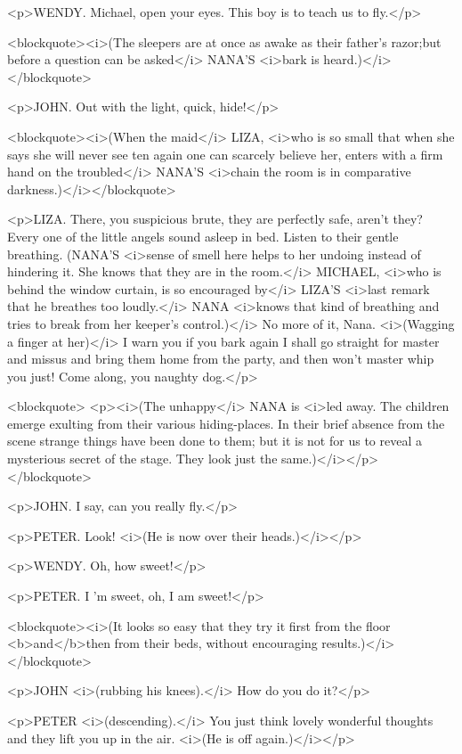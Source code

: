 <p>WENDY. Michael, open your eyes. This boy is to teach us to fly.</p>

<blockquote><i>(The sleepers are at once as awake as their father's razor;but before a question can be asked</i> NANA'S <i>bark is heard.)</i></blockquote>

<p>JOHN. Out with the light, quick, hide!</p>

<blockquote><i>(When the maid</i> LIZA, <i>who is so small that when she says she will never see ten again one can scarcely believe her, enters with a firm hand on the troubled</i> NANA'S <i>chain the room is in comparative darkness.)</i></blockquote>

<p>LIZA. There, you suspicious brute, they are perfectly safe, aren't they? Every one of the little angels sound asleep in bed. Listen to their gentle breathing. (NANA'S <i>sense of smell here helps to her undoing instead of hindering it. She knows that they are in the room.</i> MICHAEL, <i>who is behind the window curtain, is so encouraged by</i> LIZA'S <i>last remark that he breathes too loudly.</i> NANA <i>knows that kind of breathing and tries to break from her keeper's control.)</i> No more of it, Nana. <i>(Wagging a finger at her)</i> I warn you if you bark again I shall go straight for master and missus and bring them home from the party, and then won't master whip you just! Come along, you naughty dog.</p>

<blockquote> <p><i>(The unhappy</i> NANA is <i>led away. The children emerge exulting from their various hiding-places. In their brief absence from the scene strange things have been done to them; but it is not for us to reveal a mysterious secret of the stage. They look just the same.)</i></p> </blockquote>

<p>JOHN. I say, can you really fly.</p>

<p>PETER. Look! <i>(He is now over their heads.)</i></p>

<p>WENDY. Oh, how sweet!</p>

<p>PETER. I 'm sweet, oh, I am sweet!</p>

<blockquote><i>(It looks so easy that they try it first from the floor <b>and</b>then from their beds, without encouraging results.)</i></blockquote>

<p>JOHN <i>(rubbing his knees).</i> How do you do it?</p>

<p>PETER <i>(descending).</i> You just think lovely wonderful thoughts and they lift you up in the air. <i>(He is off again.)</i></p>


